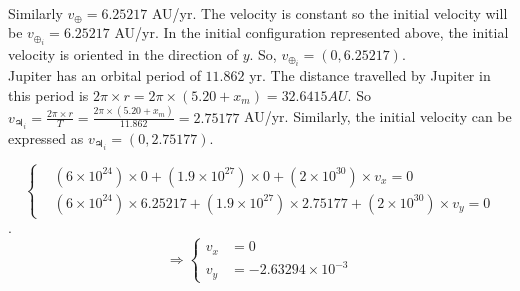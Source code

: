 \documentclass[a4paper, twoside, 11pt]{report}
\theoremstyle{theorem}
\theoremstyle{remark}
\theoremstyle{exemple}
\begin{document}
            \paragraph{}Similarly $v_{\oplus} = 6.25217$ AU/yr. The velocity is constant so the initial velocity will be $v_{\oplus_i}=6.25217$ AU/yr. In the initial configuration represented above, the initial velocity is oriented in the direction of $y$. So, $v_{\oplus_i} = \left(0, 6.25217\right)$. \\
            Jupiter has an orbital period of $11.862$ yr. The distance travelled by Jupiter in this period is $2 \pi \times r = 2 \pi \times (5.20 + x_m) = 32.6415 AU$. So $v_{\jupiter_i}= \frac{2 \pi \times r}{T} = \frac{2 \pi \times (5.20+x_m)}{11.862} = 2.75177 $ AU/yr. Similarly, the initial velocity can be expressed as $v_{\jupiter_i} = \left(0, 2.75177\right)$.
            
                \begin{equation*}
                    \left\{
                        \begin{aligned}
                            &(6\times 10^{24}) \times 0 + (1.9 \times 10^{27}) \times 0 + (2 \times 10^{30}) \times v_x = 0 \\
                            &(6\times 10^{24}) \times 6.25217 + (1.9 \times 10^{27}) \times 2.75177 + (2 \times 10^{30}) \times v_y = 0
                        \end{aligned}
                    \right.
                \end{equation*}.
                \begin{equation*}
                   \Longrightarrow \left\{
                        \begin{aligned}
                            v_x &= 0\\
                            v_y &= - 2.63294 \times 10^{-3}
                        \end{aligned}
                    \right.
                    \tag{9}
                \end{equation*}
\end{document}
